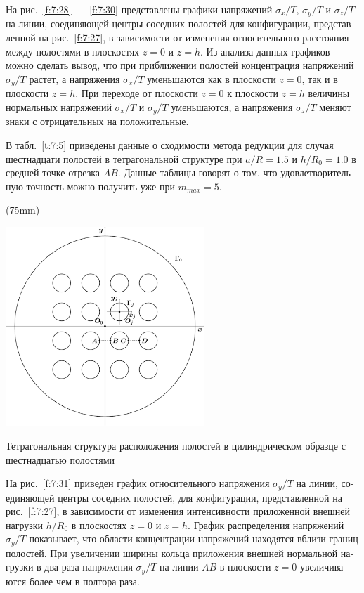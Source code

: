 \begin{russian}
На рис.~\ref{f:7:28}~--- \ref{f:7:30} представлены графики напряжений $\sigma_x/T$, $\sigma_y/T$ и $\sigma_z/T$ на линии, соединяющей центры соседних полостей для конфигурации, представленной на рис.~\ref{f:7:27}, в зависимости от изменения относительного расстояния между полостями в плоскостях $z=0$ и $z=h$. Из анализа данных графиков можно сделать вывод, что при приближении полостей концентрация напряжений $\sigma_y/T$ растет, а напряжения $\sigma_x/T$ уменьшаются как в плоскости $z=0$, так и в плоскости $z=h$. При переходе от плоскости $z=0$ к плоскости $z=h$ величины нормальных напряжений $\sigma_x/T$ и $\sigma_y/T$ уменьшаются, а напряжения $\sigma_z/T$ меняют знаки с отрицательных на положительные.

В табл.~\ref{t:7:5} приведены данные о сходимости метода редукции для случая шестнадцати полостей в тетрагональной структуре при $a/R=1.5$ и $h/R_0=1.0$ в средней точке отрезка $AB$. Данные таблицы говорят о том, что удовлетворительную точность можно получить уже при $m_{max}=5$.

\sidefig(75mm){
\includegraphics[width=7.5cm]{tetragonal-16.pdf}
\caption{Тетрагональная структура расположения полостей в цилиндрическом образце с шестнадцатью полостями}
\label{f:7:27}
}{На рис.~\ref{f:7:31} приведен график относительного напряжения $\sigma_y/T$ на линии, соединяющей центры соседних полостей, для конфигурации, представленной на рис.~\ref{f:7:27}, в зависимости от изменения интенсивности приложенной внешней нагрузки $h/R_0$ в плоскостях $z=0$ и $z=h$. График распределения напряжений $\sigma_y/T$ показывает, что области концентрации напряжений находятся вблизи границ полостей. При увеличении ширины кольца приложения внешней нормальной нагрузки в два раза напряжения $\sigma_y/T$ на линии $AB$ в плоскости $z=0$ увеличиваются более чем в полтора раза.\par\sloppy
}


\end{russian}
